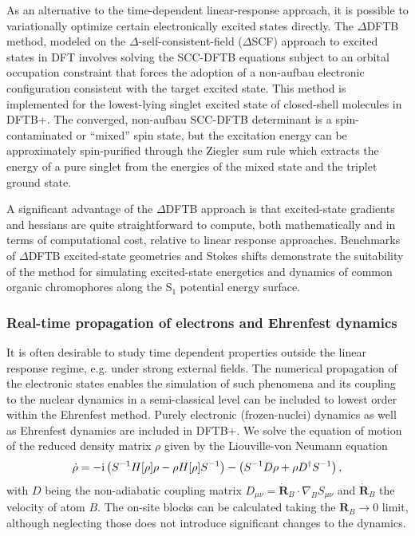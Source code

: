 \documentclass[reprint,onecolumn,superscriptaddress]{revtex4-1}
\newcommand{\dftbp}{DFTB+}
\begin{document}
As an alternative to the time-dependent linear-response approach, it is possible
to variationally optimize certain electronically excited states directly. The
$\Delta$DFTB method, modeled on the $\Delta$-self-consistent-field ($\Delta$SCF)
approach to excited states in DFT\cite{Ziegler1977,Kowalczyk2011} involves
solving the SCC-DFTB equations subject to an orbital occupation constraint that
forces the adoption of a non-aufbau electronic configuration consistent with the
target excited state. This method is implemented for the lowest-lying singlet
excited state of closed-shell molecules in \dftbp{}.\cite{Kowalczyk2016} The
converged, non-aufbau SCC-DFTB determinant is a spin-contaminated or ``mixed''
spin state, but the excitation energy can be approximately spin-purified through
the Ziegler sum rule which extracts the energy of a pure singlet from the
energies of the mixed state and the triplet ground state.

A significant advantage of the $\Delta$DFTB approach is that excited-state
gradients and hessians are quite straightforward to compute, both mathematically
and in terms of computational cost, relative to linear response
approaches. Benchmarks of $\Delta$DFTB excited-state geometries and Stokes
shifts\cite{Kowalczyk2016} demonstrate the suitability of the method for
simulating excited-state energetics and dynamics of common organic chromophores
along the S$_1$ potential energy surface.

\subsubsection{Real-time propagation of electrons and Ehrenfest dynamics}

It is often desirable to study time dependent properties outside the linear
response regime, e.g. under strong external fields. The numerical propagation of
the electronic states enables the simulation of such phenomena and its coupling
to the nuclear dynamics in a semi-classical level can be included to lowest order
within the Ehrenfest method. Purely electronic (frozen-nuclei) dynamics as well
as Ehrenfest dynamics are included in \dftbp{}. We solve the equation of motion
of the reduced density matrix $\rho$ given by the Liouville-von Neumann equation
\begin{equation}
  \dot{\rho}=-\mathrm{i}\left(S^{-1} H[\rho] \rho-\rho H[\rho]
  S^{-1}\right)-\left(S^{-1} D \rho+\rho D^{\dagger} S^{-1}\right)
  \label{eq:rhodot}
  \text,
\end{equation}
with $D$ being the non-adiabatic coupling matrix $D_{\mu \nu} =
\dot{\mathbf{R}}_B \cdot \nabla_B S_{\mu \nu}$ and $\dot{\mathbf{R}}_B$ the
velocity of atom $B$. The on-site blocks can be calculated taking the
$\mathbf{R}_B \to 0$ limit, although neglecting those does not introduce
significant changes to the dynamics.\cite{Niehaus:2005da}
\end{document}
